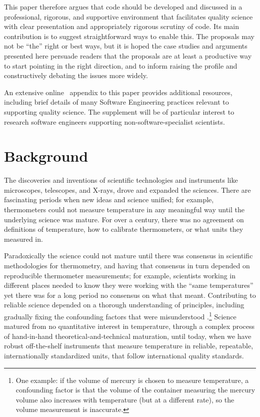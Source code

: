 \documentclass{comjnl}
\begin{document}
This paper therefore argues that code should be developed and discussed in a professional, rigorous, and supportive environment that facilitates quality science with clear presentation and appropriately rigorous scrutiny of code. Its main contribution is to suggest straightforward ways to enable this. The proposals may not be ``the'' right or best ways, but it is hoped the case studies and arguments presented here persuade readers that the proposals are at least a productive way to start pointing in the right direction, and to inform raising the profile and constructively debating the issues more widely. 

An extensive online \supplement\ appendix to this paper provides additional resources, including brief details of many Software Engineering practices relevant to supporting quality science. The supplement will be of particular interest to research software engineers supporting non-software-specialist scientists.

\section{Background}
The discoveries and inventions of scientific technologies and instruments like microscopes, telescopes, and X-rays, drove and expanded the sciences. There are fascinating periods when new ideas and science unified; for example, thermometers could not measure temperature in any meaningful way until the underlying science was mature. For over a century, there was no agreement on definitions of temperature, how to calibrate thermometers, or what units they measured in. 

Paradoxically the science could not mature until there was consensus in scientific methodologies for thermometry, and having that consensus in turn depended on reproducible thermometer measurements; for example, scientists working in different places needed to know they were working with the ``same temperatures'' yet there was for a long period no consensus on what that meant. Contributing to reliable science depended on a thorough understanding of principles, including gradually fixing the confounding factors that were misunderstood \cite{temperature}.\footnote{One example: if the volume of mercury is chosen to measure temperature, a confounding factor is that the volume of the container measuring the mercury volume also increases with temperature (but at a different rate), so the volume measurement is inaccurate.} 
Science matured from no quantitative interest in temperature, through a complex process of hand-in-hand theoretical-and-technical maturation, until today, when we have robust off-the-shelf instruments that measure temperature in reliable, repeatable, internationally standardized units, that follow international quality standards.
\end{document}
